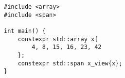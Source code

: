 \begin{lstlisting}[title=\href{https://godbolt.org/z/66exs6}{\texttt{godbolt.org/z/66exs6}}]
#include <array>
#include <span>

int main() {
    constexpr std::array x{
        4, 8, 15, 16, 23, 42
    };
    constexpr std::span x_view{x};
}
\end{lstlisting}
